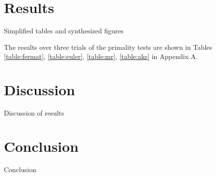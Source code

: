 \documentclass{article}
\begin{document}
\section{Results}
Simplified tables and synthesized figures

The results over three trials of the primality tests are shown in Tables \ref{table:fermat}, \ref{table:euler}, \ref{table:mr}, \ref{table:aks} in Appendix A.

\section{Discussion}
Discussion of results

\section{Conclusion}
Conclusion

\nocite{*}


\end{document}
